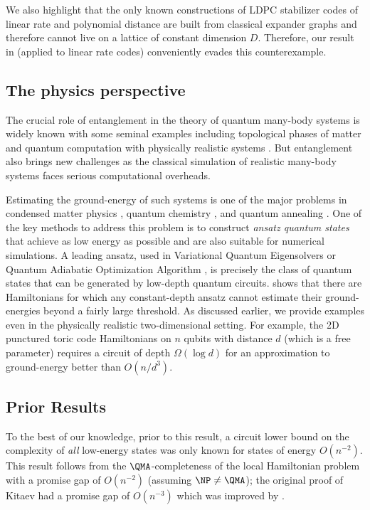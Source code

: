 \documentclass{toc}
\begin{document}
We also highlight that the only known constructions of LDPC stabilizer codes of linear rate and polynomial distance are built from classical expander graphs and therefore cannot live on a lattice of constant dimension $D$. Therefore, our result in  (applied to linear rate codes) conveniently evades this counterexample.




\subsection{The physics perspective}

 
The crucial role of entanglement in the theory of quantum many-body systems is widely known with some seminal examples including topological phases of matter \cite{KitaevP06} and quantum computation with physically realistic systems \cite{RaussendorfB01, RaussendorfB03}. But entanglement also brings new challenges as the classical simulation of realistic many-body systems faces serious computational overheads. 

Estimating the ground-energy of such systems is one of the major problems in condensed matter physics \cite{White92}, quantum chemistry \cite{Cao2019}, and quantum annealing \cite{ApolloniCF89, KadowakiN98}. One of the key methods to address this problem is to construct \emph{ansatz quantum states} that achieve as
%
low energy  %
as possible and are also suitable for numerical simulations. A leading ansatz, used in Variational Quantum Eigensolvers \cite{Peruzzo14, LaRose2019, Cao2019} or Quantum Adiabatic Optimization Algorithm \cite{farhi2014quantum}, is precisely the class of quantum states that can be generated by low-depth quantum circuits. 
%
 shows that there are Hamiltonians for which any constant-depth ansatz cannot estimate their ground-energies beyond a fairly large threshold. As discussed earlier, we provide examples even in the physically realistic two-dimensional setting. For example, the 2D punctured toric code Hamiltonians on $n$ qubits with distance $d$ (which is a free parameter) requires a circuit of depth $\Omega(\log d)$ for an approximation to ground-energy better than $O(n/d^3)$.  

\subsection{Prior Results}

To the best of our knowledge, prior to this result, a circuit lower bound on the complexity of \emph{all} low-energy states was only known for states of energy $O(n^{-2})$. This result follows from the $\QMA$-completeness of the local Hamiltonian problem with a promise gap of $O(n^{-2})$ (assuming $\NP \neq \QMA$); the original proof of Kitaev had a promise gap of $O(n^{-3})$  \cite{10.5555/863284,doi:10.1137/S0097539704445226} which was improved by \cite{PhysRevA.97.062306,Bausch2018analysislimitations}.
\end{document}
